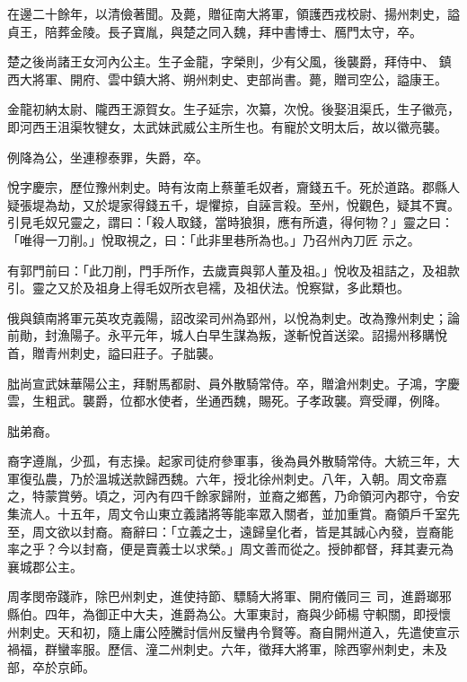 \begin{pinyinscope}
 在邊二十餘年，以清儉著聞。及薨，贈征南大將軍，領護西戎校尉、揚州刺史，謚貞王，陪葬金陵。長子寶胤，與楚之同入魏，拜中書博士、鴈門太守，卒。



 楚之後尚諸王女河內公主。生子金龍，字榮則，少有父風，後襲爵，拜侍中、
 鎮西大將軍、開府、雲中鎮大將、朔州刺史、吏部尚書。薨，贈司空公，謚康王。



 金龍初納太尉、隴西王源賀女。生子延宗，次纂，次悅。後娶沮渠氏，生子徽亮，即河西王沮渠牧犍女，太武妹武威公主所生也。有寵於文明太后，故以徽亮襲。



 例降為公，坐連穆泰罪，失爵，卒。



 悅字慶宗，歷位豫州刺史。時有汝南上蔡董毛奴者，齎錢五千。死於道路。郡縣人疑張堤為劫，又於堤家得錢五千，堤懼掠，自誣言殺。至州，悅觀色，疑其不實。引見毛奴兄靈之，謂曰：「殺人取錢，當時狼狽，應有所遺，得何物？」靈之曰：「唯得一刀削。」悅取視之，曰：「此非里巷所為也。」乃召州內刀匠
 示之。



 有郭門前曰：「此刀削，門手所作，去歲賣與郭人董及祖。」悅收及祖詰之，及祖款引。靈之又於及祖身上得毛奴所衣皂襦，及祖伏法。悅察獄，多此類也。



 俄與鎮南將軍元英攻克義陽，詔改梁司州為郢州，以悅為刺史。改為豫州刺史；論前勛，封漁陽子。永平元年，城人白早生謀為叛，遂斬悅首送梁。詔揚州移購悅首，贈青州刺史，謚曰莊子。子朏襲。



 朏尚宣武妹華陽公主，拜駙馬都尉、員外散騎常侍。卒，贈滄州刺史。子鴻，字慶雲，生粗武。襲爵，位都水使者，坐通西魏，賜死。子孝政襲。齊受禪，例降。



 朏弟裔。



 裔字遵胤，少孤，有志操。起家司徒府參軍事，後為員外散騎常侍。大統三年，大軍復弘農，乃於溫城送款歸西魏。六年，授北徐州刺史。八年，入朝。周文帝嘉之，特蒙賞勞。頃之，河內有四千餘家歸附，並裔之鄉舊，乃命領河內郡守，令安集流人。十五年，周文令山東立義諸將等能率眾入關者，並加重賞。裔領戶千室先至，周文欲以封裔。裔辭曰：「立義之士，遠歸皇化者，皆是其誠心內發，豈裔能率之乎？今以封裔，便是賣義士以求榮。」周文善而從之。授帥都督，拜其妻元為襄城郡公主。



 周孝閔帝踐祚，除巴州刺史，進使持節、驃騎大將軍、開府儀同三
 司，進爵瑯邪縣伯。四年，為御正中大夫，進爵為公。大軍東討，裔與少師楊守軹關，即授懷州刺史。天和初，隨上庸公陸騰討信州反蠻冉令賢等。裔自開州道入，先遣使宣示禍福，群蠻率服。歷信、潼二州刺史。六年，徵拜大將軍，除西寧州刺史，未及部，卒於京師。




\end{pinyinscope}
